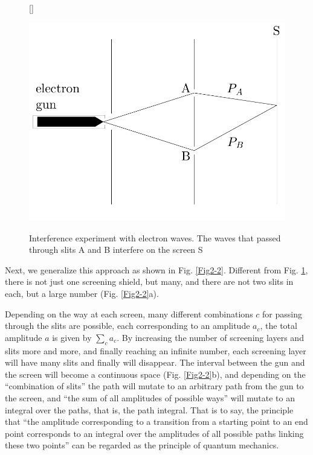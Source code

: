 \begin{figure}
[\FBwidth]
{\caption{Interference experiment with electron waves. The waves that passed through slits A and B interfere on the screen S}\label{Fig2-1}}
{\includegraphics[width=.5\textwidth]{./Figure/Fig2-1.pdf}}
\end{figure}

Next, we generalize this approach as shown in Fig. \ref{Fig2-2}. Different from Fig. \ref{Fig2-1}, there is not just one screening shield, but many, and there are not two slits in each, but a large number (Fig. \ref{Fig2-2}a).

Depending on the way at each screen, many different combinations $c$ for passing through the slits are possible, each corresponding to an amplitude $a_c$, the total amplitude $a$ is given by $\sum _ { c } a _ { c }$. By increasing the number of screening layers and slits more and more, and finally reaching an infinite number, each screening layer will have many slits and finally will disappear. The interval between the gun and the screen will become a continuous space (Fig. \ref{Fig2-2}b), and depending on the “combination of slits” the path will mutate to an arbitrary path from the gun to the screen, and “the sum of all amplitudes of possible ways” will mutate to an integral over the paths, that is, the path integral. That is to say, the principle that “the amplitude corresponding to a transition from a starting point to an end point corresponds to an integral over the amplitudes of all possible paths linking these two points” can be regarded as the principle of quantum mechanics.

